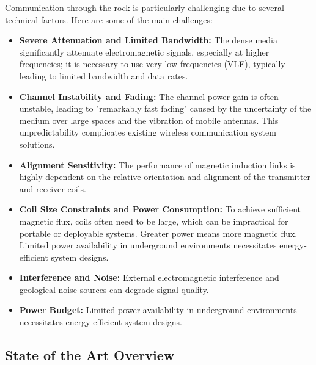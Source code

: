Communication through the rock is particularly challenging due to several technical factors. Here are some of the main challenges:

\begin{itemize}
     \item \textbf{Severe Attenuation and Limited Bandwidth:} The dense media significantly attenuate electromagnetic signals, especially at higher frequencies; it is necessary to use very low frequencies (VLF), typically leading to limited bandwidth and data rates. \cite{carreno2016through}
 
    \item \textbf{Channel Instability and Fading:} The channel power gain is often unstable, leading to "remarkably fast fading" caused by the uncertainty of the medium over large spaces and the vibration of mobile antennas. This unpredictability complicates existing wireless communication system solutions.

    \item \textbf{Alignment Sensitivity:} The performance of magnetic induction links is highly dependent on the relative orientation and alignment of the transmitter and receiver coils.
 
    \item \textbf{Coil Size Constraints and Power Consumption:} To achieve sufficient magnetic flux, coils often need to be large, which can be impractical for portable or deployable systems. Greater power means more magnetic flux. Limited power availability in underground environments necessitates energy-efficient system designs.
 
    \item \textbf{Interference and Noise:} External electromagnetic interference and geological noise sources can degrade signal quality.
    \item \textbf{Power Budget:} Limited power availability in underground environments necessitates energy-efficient system designs.
\end{itemize}


\subsection{State of the Art Overview}
\label{sec:state_of_art}

